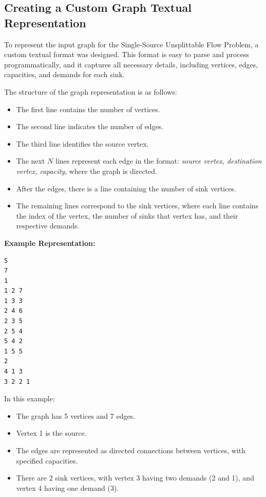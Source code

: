\documentclass[a4paper,12pt]{article}
\begin{document}
\subsection{Creating a Custom Graph Textual Representation}

To represent the input graph for the Single-Source Unsplittable Flow Problem, a custom textual format was designed. This format is easy to parse and process programmatically, and it captures all necessary details, including vertices, edges, capacities, and demands for each sink.

The structure of the graph representation is as follows:
\begin{itemize}
    \item The first line contains the number of vertices.
    \item The second line indicates the number of edges.
    \item The third line identifies the source vertex.
    \item The next \(N\) lines represent each edge in the format: \textit{source vertex, destination vertex, capacity}, where the graph is directed.
    \item After the edges, there is a line containing the number of sink vertices.
    \item The remaining lines correspond to the sink vertices, where each line contains the index of the vertex, the number of sinks that vertex has, and their respective demands.
\end{itemize}

\noindent \textbf{Example Representation:}

\begin{verbatim}
5
7
1
1 2 7
1 3 3
2 4 6
2 3 5
2 5 4
5 4 2
1 5 5
2
4 1 3
3 2 2 1
\end{verbatim}

\noindent In this example:
\begin{itemize}
    \item The graph has 5 vertices and 7 edges.
    \item Vertex 1 is the source.
    \item The edges are represented as directed connections between vertices, with specified capacities.
    \item There are 2 sink vertices, with vertex 3 having two demands (2 and 1), and vertex 4 having one demand (3).
\end{itemize}
\end{document}
